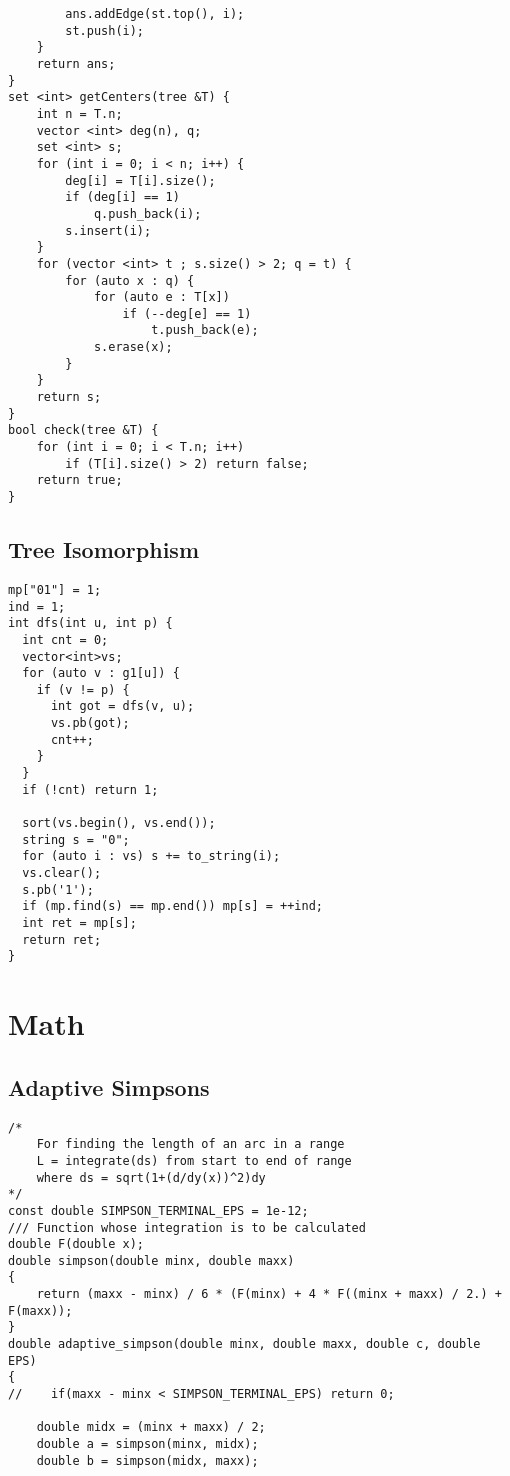 \documentclass[FSZ,a4paper,onesided]{article}
\begin{document}
\begin{multicols*}{\COLS}
\begin{lstlisting}
        ans.addEdge(st.top(), i);
        st.push(i);
    }
    return ans;
}
set <int> getCenters(tree &T) {
    int n = T.n;
    vector <int> deg(n), q;
    set <int> s;
    for (int i = 0; i < n; i++) {
        deg[i] = T[i].size();
        if (deg[i] == 1)
            q.push_back(i);
        s.insert(i);
    }
    for (vector <int> t ; s.size() > 2; q = t) {
        for (auto x : q) {
            for (auto e : T[x]) 
                if (--deg[e] == 1)
                    t.push_back(e);
            s.erase(x);
        }
    }
    return s;
}
bool check(tree &T) {
    for (int i = 0; i < T.n; i++)
        if (T[i].size() > 2) return false;
    return true;
}
\end{lstlisting}
\subsection{Tree Isomorphism}
\begin{lstlisting}
mp["01"] = 1;
ind = 1;
int dfs(int u, int p) {
  int cnt = 0;
  vector<int>vs;
  for (auto v : g1[u]) {
    if (v != p) {
      int got = dfs(v, u);
      vs.pb(got);
      cnt++;
    }
  }
  if (!cnt) return 1;

  sort(vs.begin(), vs.end());
  string s = "0";
  for (auto i : vs) s += to_string(i);
  vs.clear();
  s.pb('1');
  if (mp.find(s) == mp.end()) mp[s] = ++ind;
  int ret = mp[s];
  return ret;
}
\end{lstlisting}
\section{Math}
\subsection{Adaptive Simpsons}
\begin{lstlisting}
/*
    For finding the length of an arc in a range
    L = integrate(ds) from start to end of range
    where ds = sqrt(1+(d/dy(x))^2)dy
*/
const double SIMPSON_TERMINAL_EPS = 1e-12;
/// Function whose integration is to be calculated
double F(double x);
double simpson(double minx, double maxx)
{
    return (maxx - minx) / 6 * (F(minx) + 4 * F((minx + maxx) / 2.) + F(maxx));
}
double adaptive_simpson(double minx, double maxx, double c, double EPS)
{
//    if(maxx - minx < SIMPSON_TERMINAL_EPS) return 0;

    double midx = (minx + maxx) / 2;
    double a = simpson(minx, midx);
    double b = simpson(midx, maxx);


\end{lstlisting}
\end{multicols*}
\end{document}
